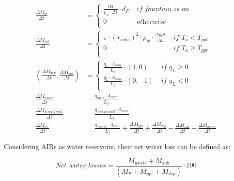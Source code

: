 \begin{subequations}
	\begin{align}
		\frac{\Delta M_{F}}{\Delta t} & = \left\{ \begin{array}{ll} \frac{60}{\rho_w \cdot \Delta t} \cdot d_F
			 & \textit{ if fountain is on} \\ 0 & \textit{ otherwise } \\\end{array} \right.                                             \\
		\label{eq:ppt}
		\frac{\Delta M_{ppt}}{\Delta t}                                    & = \left\{ \begin{array}{ll} \pi \cdot
        {(r_{cone})}^2 \cdot
			\rho_{w}\cdot \frac {\Delta ppt}{\Delta t} & \textit{ if } T_{a} < T_{ppt} \\ 0 & \textit{ if } T_{a} \geq T_{ppt} \\\end{array} \right.                                             \\
		\label{eq:vap}
		(\frac{\Delta M_{dep}}{\Delta t}, \frac{\Delta M_{sub}}{\Delta t}) & = \left\{ \begin{array}{ll} \frac{q_{L}
			\cdot A_{cone}}{L_s}\cdot (1,0)  & \textit{ if } q_{L} \geq 0 \\ \frac{q_{L}
			\cdot A_{cone}}{L_s}\cdot (0,-1) & \textit{ if } q_{L} < 0    \\\end{array} \right.                                             \\
		\label{eq:mwat}
		\frac{\Delta M_{water}}{\Delta t}                                  & = \frac{q_{melt} \cdot A_{cone} }{L_f}                                                   \\
	  \label{eq:m_freeze/melt}
    \frac{\Delta M_{freeze/melt}}{\Delta t} & = \frac{q_{freeze/melt} \cdot A_{cone} }{L_f} \\
		\label{eq:mcone}
		\frac{\Delta M_{ice}}{\Delta t}                                    & = \frac{q_{freeze}\cdot A_{cone} }{L_f} + \frac{\Delta M_{ppt}}{\Delta t} + \frac{\Delta
			M_{dep}}{\Delta t}- \frac{\Delta M_{sub}}{\Delta t}- \frac{\Delta M_{water}}{\Delta t}
	\end{align}
\end{subequations}

Considering \ac{AIRs} as water reservoirs, their net water loss can be defined as:

\begin{equation} \textit{Net water losses} = \frac{M_{waste}+M_{sub}}{(M_F+M_{ppt}+M_{dep})} \cdot 100 \end{equation}


